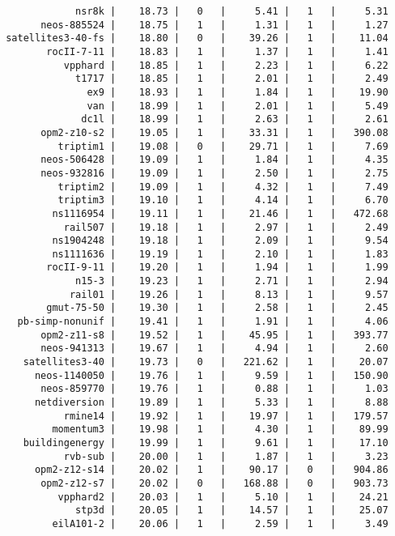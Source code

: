 \begin{verbatim}
             nsr8k |    18.73 |   0   |     5.41 |   1   |     5.31
       neos-885524 |    18.75 |   1   |     1.31 |   1   |     1.27
 satellites3-40-fs |    18.80 |   0   |    39.26 |   1   |    11.04
        rocII-7-11 |    18.83 |   1   |     1.37 |   1   |     1.41
           vpphard |    18.85 |   1   |     2.23 |   1   |     6.22
             t1717 |    18.85 |   1   |     2.01 |   1   |     2.49
               ex9 |    18.93 |   1   |     1.84 |   1   |    19.90
               van |    18.99 |   1   |     2.01 |   1   |     5.49
              dc1l |    18.99 |   1   |     2.63 |   1   |     2.61
       opm2-z10-s2 |    19.05 |   1   |    33.31 |   1   |   390.08
          triptim1 |    19.08 |   0   |    29.71 |   1   |     7.69
       neos-506428 |    19.09 |   1   |     1.84 |   1   |     4.35
       neos-932816 |    19.09 |   1   |     2.50 |   1   |     2.75
          triptim2 |    19.09 |   1   |     4.32 |   1   |     7.49
          triptim3 |    19.10 |   1   |     4.14 |   1   |     6.70
         ns1116954 |    19.11 |   1   |    21.46 |   1   |   472.68
           rail507 |    19.18 |   1   |     2.97 |   1   |     2.49
         ns1904248 |    19.18 |   1   |     2.09 |   1   |     9.54
         ns1111636 |    19.19 |   1   |     2.10 |   1   |     1.83
        rocII-9-11 |    19.20 |   1   |     1.94 |   1   |     1.99
             n15-3 |    19.23 |   1   |     2.71 |   1   |     2.94
            rail01 |    19.26 |   1   |     8.13 |   1   |     9.57
        gmut-75-50 |    19.30 |   1   |     2.58 |   1   |     2.45
   pb-simp-nonunif |    19.41 |   1   |     1.91 |   1   |     4.06
       opm2-z11-s8 |    19.52 |   1   |    45.95 |   1   |   393.77
       neos-941313 |    19.67 |   1   |     4.94 |   1   |     2.60
    satellites3-40 |    19.73 |   0   |   221.62 |   1   |    20.07
      neos-1140050 |    19.76 |   1   |     9.59 |   1   |   150.90
       neos-859770 |    19.76 |   1   |     0.88 |   1   |     1.03
      netdiversion |    19.89 |   1   |     5.33 |   1   |     8.88
           rmine14 |    19.92 |   1   |    19.97 |   1   |   179.57
         momentum3 |    19.98 |   1   |     4.30 |   1   |    89.99
    buildingenergy |    19.99 |   1   |     9.61 |   1   |    17.10
           rvb-sub |    20.00 |   1   |     1.87 |   1   |     3.23
      opm2-z12-s14 |    20.02 |   1   |    90.17 |   0   |   904.86
       opm2-z12-s7 |    20.02 |   0   |   168.88 |   0   |   903.73
          vpphard2 |    20.03 |   1   |     5.10 |   1   |    24.21
             stp3d |    20.05 |   1   |    14.57 |   1   |    25.07
         eilA101-2 |    20.06 |   1   |     2.59 |   1   |     3.49

\end{verbatim}
